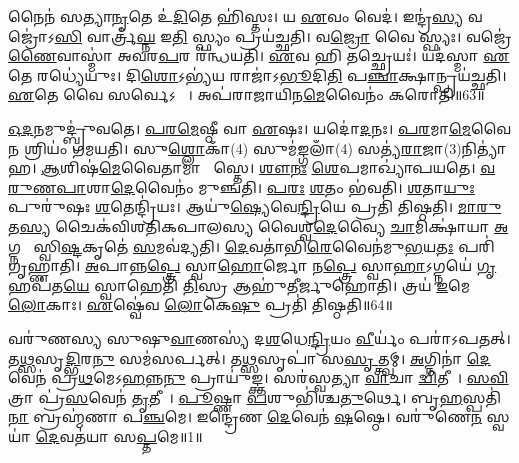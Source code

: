 𑌨𑍈𑌨॑ 𑌸𑌤𑍍𑌯𑌾\ul{𑌨𑍃}𑌤𑍇 𑌉॑\ul{𑌦𑌿}𑌤𑍇 𑌹𑌿॑𑌸𑍍𑌤𑌃।
𑌯 \ul{𑌏}𑌵𑌂 𑌵𑍇𑌦॑।
𑌇𑌨𑍍𑌦𑍍𑌰॑\ul{𑌸𑍍𑌯} 𑌵𑌜𑍍𑌰𑍋॑𑌽\ul{𑌸𑌿} 𑌵𑌾𑌰𑍍𑌤𑍍𑌰॑\ul{𑌘𑍍𑌨} 𑌇\ul{𑌤𑌿} 𑌸𑍍𑌫𑍍𑌯𑌂 𑌪𑍍𑌰𑌯॑𑌚𑍍𑌛𑌤𑌿।
𑌵\ul{𑌜𑍍𑌰𑍋} 𑌵𑍈 𑌸𑍍𑌫𑍍𑌯𑌃।
𑌵𑌜𑍍𑌰𑍇॑\ul{𑌣𑍈}𑌵𑌾𑌸𑍍𑌮𑌾॑ 𑌅𑌵𑌰\ul{𑌪}𑌰 𑌰॑𑌨𑍍𑌧𑌯𑌤𑌿।
\ul{𑌏}𑌵 𑌹𑌿 𑌤𑌚𑍍𑌛𑍍𑌰𑍇𑌯𑌃॑।
𑌯𑌦॑𑌸𑍍𑌮𑌾 \ul{𑌏}𑌤𑍇 𑌰𑌧𑍍𑌯𑍇॑𑌯𑍁𑌃।
𑌦𑌿\ul{𑌶𑍋}\-𑌽𑌭𑍍𑌯॑𑌯 𑌰𑌾𑌜𑌾॑\-𑌽\ul{𑌭𑍂}𑌦𑌿\ul{𑌤𑌿} 𑌪\ul{𑌞𑍍𑌚𑌾}𑌕𑍍𑌷𑌾𑌨𑍍𑌪𑍍𑌰𑌯॑𑌚𑍍𑌛𑌤𑌿।
\ul{𑌏}𑌤𑍇 𑌵𑍈 𑌸𑌰𑍍𑌵𑍇\-𑌽𑌯𑌾𑌃᳚।
𑌅𑌪॑𑌰𑌾𑌜𑌾𑌯𑌿𑌨\ul{𑌮𑍇}𑌵𑍈𑌨𑌂॑ 𑌕𑌰𑍋𑌤𑌿॥63॥

\ul{𑌓}\ul{𑌦}𑌨𑌮𑍁𑌦𑍍𑌬𑍍𑌰𑍁॑𑌵𑌤𑍇।
\ul{𑌪}\ul{𑌰}\ul{𑌮𑍇}𑌷𑍍𑌠𑍀 𑌵𑌾 \ul{𑌏}𑌷𑌃।
𑌯𑌦𑍋॑\ul{𑌦}𑌨𑌃।
\ul{𑌪}\ul{𑌰}𑌮𑌾\ul{𑌮𑍇}𑌵𑍈\ul{𑌨}\ul{} 𑌶𑍍𑌰𑌿𑌯𑌂॑ 𑌗𑌮𑌯𑌤𑌿।
𑌸𑍁\ul{𑌶𑍍𑌲𑍋}𑌕𑌾𑌁(4) 𑌸𑍁𑌮॑\ul{𑌙𑍍𑌗}𑌲𑌾𑌁(4) 𑌸𑌤𑍍𑌯॑\ul{𑌰𑌾}𑌜𑌾(3)\-𑌨𑌿𑌤𑍍𑌯𑌾॑𑌹।
\ul{𑌆}𑌶𑌿𑌷॑\ul{𑌮𑍇}𑌵𑍈𑌤𑌾𑌮𑌾 𑌶𑌾᳚𑌸𑍍𑌤𑍇।
\ul{𑌶𑍗}\ul{𑌨𑌃} \ul{𑌶𑍇}𑌪𑌮𑌾𑌖𑍍𑌯𑌾॑𑌪𑌯𑌤𑍇।
\ul{𑌵}\ul{𑌰𑍁}\ul{𑌣}\ul{𑌪𑌾}𑌶𑌾\ul{𑌦𑍇}𑌵𑍈𑌨𑌂॑ 𑌮𑍁𑌞𑍍𑌚𑌤𑌿।
\ul{𑌪}\ul{𑌰𑌃} \ul{𑌶}𑌤𑌂 𑌭॑𑌵𑌤𑌿।
\ul{𑌶}𑌤𑌾\ul{𑌯𑍁𑌃} 𑌪𑍁𑌰𑍁॑𑌷𑌃 \ul{𑌶}𑌤𑍇𑌨𑍍𑌦𑍍𑌰𑌿॑𑌯𑌃।
𑌆𑌯𑍁॑\ul{𑌷𑍍𑌯𑍇}𑌵𑍇\ul{𑌨𑍍𑌦𑍍𑌰𑌿}𑌯𑍇 𑌪𑍍𑌰𑌤𑌿॑ 𑌤𑌿𑌷𑍍𑌠𑌤𑌿।
\ul{𑌮𑌾}\ul{𑌰𑍁}𑌤\ul{𑌸𑍍𑌯} 𑌚𑍈𑌕॑𑌵𑌿𑌶𑌤𑌿𑌕𑌪𑌾𑌲𑌸𑍍𑌯 𑌵𑍈𑌶𑍍𑌵\ul{𑌦𑍇}𑌵𑍍𑌯𑍈 \ul{𑌚𑌾}𑌮𑌿𑌕𑍍𑌷𑌾॑𑌯𑌾 \ul{𑌅}𑌗𑍍𑌨𑌯𑍇᳚ 𑌸𑍍𑌵𑌿\ul{𑌷𑍍𑌟}𑌕𑍃𑌤𑍇॑ \ul{𑌸}𑌮𑌵॑𑌦𑍍𑌯𑌤𑌿।
\ul{𑌦𑍇}𑌵𑌤𑌾॑𑌭𑌿\ul{𑌰𑍇}𑌵𑍈𑌨॑𑌮𑍁\ul{𑌭}𑌯\ul{𑌤𑌃} 𑌪𑌰𑌿॑ 𑌗𑍃𑌹𑍍𑌣𑌾𑌤𑌿।
\ul{𑌅}𑌪𑌾𑌨𑍍𑌨\ul{𑌪𑍍𑌤𑍍𑌰𑍇} 𑌸𑍍𑌵𑌾\ul{𑌹𑍋}𑌰𑍍𑌜𑍋 𑌨\ul{𑌪𑍍𑌤𑍍𑌰𑍇} 𑌸𑍍𑌵𑌾\ul{𑌹𑌾}\-𑌽𑌗𑍍𑌨𑌯𑍇॑ \ul{𑌗𑍃}𑌹𑌪॑𑌤\ul{𑌯𑍇} 𑌸𑍍𑌵𑌾𑌹𑍇𑌤𑌿॑ \ul{𑌤𑌿}𑌸𑍍𑌰 𑌆𑌹𑍁॑𑌤𑍀𑌰𑍍𑌜𑍁𑌹𑍋𑌤𑌿।
𑌤𑍍𑌰𑌯॑ \ul{𑌇}𑌮𑍇 \ul{𑌲𑍋}𑌕𑌾𑌃।
\ul{𑌏}𑌷𑍍𑌵𑍇॑𑌵 \ul{𑌲𑍋}𑌕𑍇\ul{𑌷𑍁} 𑌪𑍍𑌰𑌤𑌿॑ 𑌤𑌿𑌷𑍍𑌠𑌤𑌿॥64॥\anuvakamend[\ul{𑌦𑍇}𑌵𑍈𑌰𑌿𑌤𑍍𑌯𑌾॑𑌹 \ul{𑌸}𑌤𑍍𑌯𑌸॑𑌵𑌂 𑌕𑌰𑍋𑌤𑌿 \ul{𑌤𑍍𑌰𑌿}𑌷𑍍𑌟𑍁𑌭॑\ul{𑌮𑍇}𑌵𑍈𑌤𑍇𑌨𑌾॑\ul{𑌭𑌿} 𑌵𑍍𑌯𑌾𑌹॑𑌰𑌤𑌿 𑌸𑌤𑍍𑌯𑌾\ul{𑌨𑍃}𑌤𑍇 \ul{𑌏}𑌵𑌾𑌵॑𑌰𑍁𑌨𑍍𑌧𑍇 𑌕𑌰𑍋𑌤𑌿 \ul{𑌶}𑌤𑍇𑌨𑍍𑌦𑍍𑌰𑌿॑\ul{𑌯𑌃} 𑌷𑌟𑍍 𑌚॑]




\clearpage
{}
\setcounter{anuvakam}{0}

𑌵𑌰𑍁॑𑌣𑌸𑍍𑌯 𑌸𑍁𑌷𑍁\ul{𑌵𑌾}𑌣𑌸𑍍𑌯॑ 𑌦\ul{𑌶}𑌧𑍇\ul{𑌨𑍍𑌦𑍍𑌰𑌿}𑌯𑌂 \ul{𑌵𑍀}𑌰𑍍𑌯𑌂॑ 𑌪𑌰𑌾॑\-𑌽𑌪𑌤𑌤𑍍।
𑌤\ul{𑌥𑍍𑌸}\ul{}𑌸𑍃\ul{𑌦𑍍𑌭𑌿}𑌰\ul{𑌨𑍁} 𑌸𑌮॑𑌸𑌰𑍍𑌪𑌤𑍍।
𑌤\ul{𑌥𑍍𑌸}\ul{}𑌸𑍃𑌪𑌾॑ 𑌸\ul{𑌸𑍃}𑌤𑍍𑌤𑍍𑌵𑌮𑍍।
\ul{𑌅}𑌗𑍍𑌨𑌿𑌨𑌾॑ \ul{𑌦𑍇}𑌵𑍇𑌨॑ 𑌪𑍍𑌰\ul{𑌥}𑌮𑍇\-𑌽\ul{𑌹}𑌨𑍍𑌨\ul{𑌨𑍁} 𑌪𑍍𑌰𑌾𑌯𑍁॑𑌙𑍍𑌕𑍍𑌤।
𑌸𑌰॑𑌸𑍍𑌵𑌤𑍍𑌯𑌾 \ul{𑌵𑌾}𑌚𑌾 \ul{𑌦𑍍𑌵𑌿}𑌤𑍀𑌯𑍇᳚।
\ul{𑌸}\ul{𑌵𑌿}𑌤𑍍𑌰𑌾 𑌪𑍍𑌰॑\ul{𑌸}𑌵𑍇𑌨॑ \ul{𑌤𑍃}𑌤𑍀𑌯𑍇᳚।
\ul{𑌪𑍂}𑌷𑍍𑌣𑌾 \ul{𑌪}𑌶𑍁𑌭𑌿॑𑌶𑍍𑌚\ul{𑌤𑍁}𑌰𑍍𑌥𑍇।
𑌬𑍃\ul{𑌹}𑌸𑍍𑌪𑌤𑌿॑\ul{𑌨𑌾} 𑌬𑍍𑌰𑌹𑍍𑌮॑𑌣𑌾 𑌪\ul{𑌞𑍍𑌚}𑌮𑍇।
𑌇𑌨𑍍𑌦𑍍𑌰𑍇॑𑌣 \ul{𑌦𑍇}𑌵𑍇𑌨॑ \ul{𑌷}𑌷𑍍𑌠𑍇।
𑌵𑌰𑍁॑𑌣𑍇\ul{𑌨} 𑌸𑍍𑌵𑌯𑌾॑ \ul{𑌦𑍇}𑌵𑌤॑𑌯𑌾 𑌸\ul{𑌪𑍍𑌤}𑌮𑍇॥1॥

